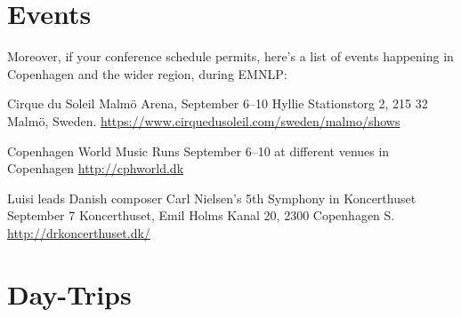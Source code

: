 \section{Events}
Moreover, if your conference schedule permits, here’s a list of events happening in Copenhagen and the wider region, during EMNLP:
\par
\bigskip


\begin{eventitem}
{Cirque du Soleil}%
{Malmö Arena, September 6--10}%
{Hyllie Stationstorg 2, 215 32 Malmö, Sweden.}%
{\url{https://www.cirquedusoleil.com/sweden/malmo/shows}}%
\end{eventitem}


\begin{eventitem}
{Copenhagen World Music}%
{Runs September 6--10 at different venues in Copenhagen}%
{}%
{\url{http://cphworld.dk}}%
\end{eventitem}

\begin{eventitem}
{Luisi leads Danish composer Carl Nielsen’s 5th Symphony in Koncerthuset}%
{September 7}%
{Koncerthuset, Emil Holms Kanal 20, 2300 Copenhagen S.}%
{\url{http://drkoncerthuset.dk/}}%
\end{eventitem}

\section{Day-Trips}

